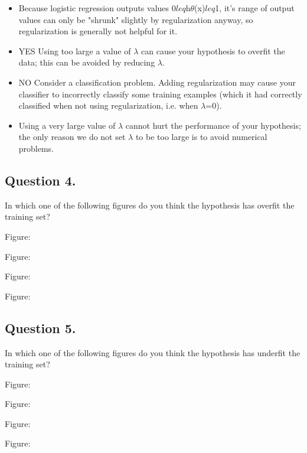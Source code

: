 \documentclass[11pt]{article} %
\begin{document}
	
	\begin{itemize}
		\item Because logistic regression outputs values 0$leq$h$\theta$(x)$leq$1, it's range of output values can only be "shrunk" slightly by regularization anyway, so regularization is generally not helpful for it.
		
		\item YES Using too large a value of $\lambda$ can cause your hypothesis to overfit the data; this can be avoided by reducing $\lambda$.
		\item 
		NO Consider a classification problem. Adding regularization may cause your classifier to incorrectly classify some training examples (which it had correctly classified when not using regularization, i.e. when $\lambda$=0).
		\item 
		Using a very large value of $\lambda$ cannot hurt the performance of your hypothesis; the only reason we do not set $\lambda$ to be too large is to avoid numerical problems.
	\end{itemize}
	\subsection{Question 4. }
	In which one of the following figures do you think the hypothesis has overfit the training set?
	
	Figure:
	
	
	
	Figure:
	
	
	
	Figure:
	
	
	
	Figure:
	
	
	\subsection{Question 5. } 
	In which one of the following figures do you think the hypothesis has underfit the training set?
	
	Figure:
	
	
	
	Figure:
	
	
	
	Figure:
	
	
	
	Figure:
	
\end{document}
